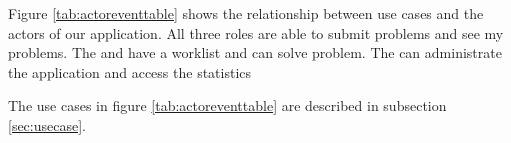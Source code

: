 


Figure \ref{tab:actoreventtable} shows the relationship between use cases and the actors of our application. All three roles are able to submit problems and see my problems. The \astaff[] and \admin[] have a worklist and can solve problem. The \admin[] can administrate the application and access the statistics

The use cases in figure \ref{tab:actoreventtable} are described in subsection \ref{sec:usecase}.


